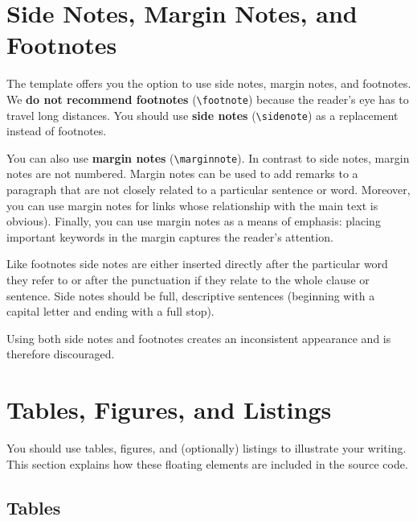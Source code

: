 \section{Side Notes, Margin Notes, and Footnotes}

The template offers you the option to use side notes, margin notes, and footnotes. We \textbf{do not recommend footnotes} (\verb|\footnote|) because the reader's eye has to travel long distances. You should use \textbf{side notes} (\verb|\sidenote|) as a replacement instead of footnotes.

You can also use \textbf{margin notes} (\verb|\marginnote|). In contrast to side notes, margin notes are not numbered. Margin notes can be used to add remarks to a paragraph that are not closely related to a particular sentence or word. Moreover, you can use margin notes for links whose relationship with the main text is obvious). Finally, you can use margin notes as a means of emphasis: placing important keywords in the margin captures the reader's attention.

Like footnotes side notes are either inserted directly after the particular word they refer to or after the punctuation if they relate to the whole clause or sentence. Side notes should be full, descriptive sentences (beginning with a capital letter and ending with a full stop).

Using both side notes and footnotes creates an inconsistent appearance and is therefore discouraged.

\section{Tables, Figures, and Listings}
\label{sec:tablesfigureslistings}

You%
should use tables, figures, and (optionally) listings to illustrate your writing. This section explains how these floating elements are included in the source code.

\subsection{Tables}

